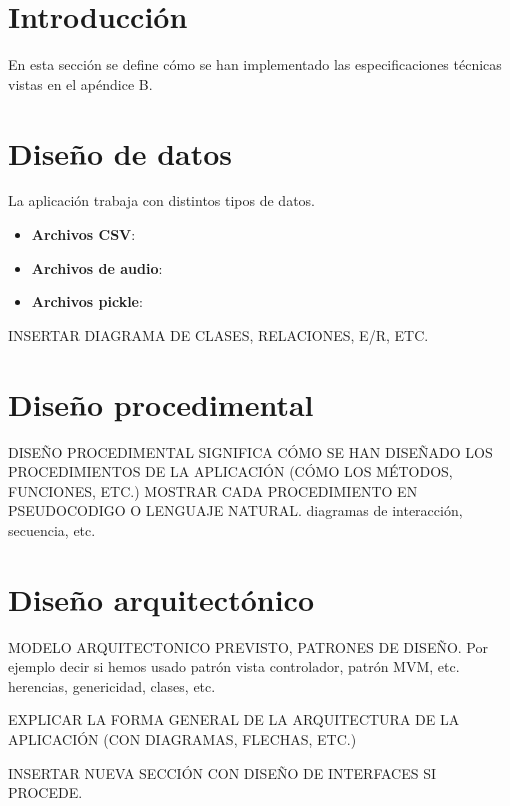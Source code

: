 
\section{Introducción}

En esta sección se define cómo se han implementado las especificaciones técnicas vistas en el apéndice B.

\section{Diseño de datos}

La aplicación trabaja con distintos tipos de datos.

\begin{itemize}
\tightlist

\item \textbf{Archivos CSV}:

\item \textbf{Archivos de audio}:

\item \textbf{Archivos pickle}:

\end{itemize}

INSERTAR DIAGRAMA DE CLASES, RELACIONES, E/R, ETC.

\section{Diseño procedimental}

DISEÑO PROCEDIMENTAL SIGNIFICA CÓMO SE HAN DISEÑADO LOS PROCEDIMIENTOS DE LA APLICACIÓN (CÓMO LOS MÉTODOS, FUNCIONES, ETC.)
MOSTRAR CADA PROCEDIMIENTO EN PSEUDOCODIGO O LENGUAJE NATURAL.
diagramas de interacción, secuencia, etc.

\section{Diseño arquitectónico}

MODELO ARQUITECTONICO PREVISTO, PATRONES DE DISEÑO. Por ejemplo decir si hemos usado patrón vista controlador, patrón MVM, etc.
herencias, genericidad, clases, etc.

EXPLICAR LA FORMA GENERAL DE LA ARQUITECTURA DE LA APLICACIÓN (CON DIAGRAMAS, FLECHAS, ETC.)

INSERTAR NUEVA SECCIÓN CON DISEÑO DE INTERFACES SI PROCEDE.